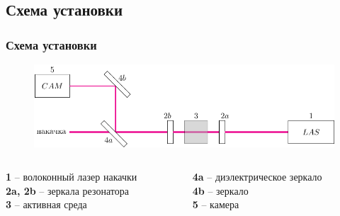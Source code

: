 \documentclass[10pt,pdf,hyperref={unicode}, dvipsnames]{beamer}
\newcommand\frametitless[1]{\subsection{#1}\frametitle{#1}}
\begin{document}
\begin{frame}
	\frametitless{Схема установки}
	\begin{figure}[tb]
		\centering
		\includegraphics[width=1\textwidth]{images/chem}
	\end{figure}
	\vspace{1cm}
	\begin{columns}
		\begin{column}{0.4\textwidth}
			\textbf{1} -- волоконный лазер накачки\\ 
			\textbf{2a, 2b} -- зеркала резонатора\\
			\textbf{3} -- активная среда
		\end{column}
		\begin{column}{0.4\textwidth}
			\textbf{4a} -- диэлектрическое зеркало\\
			\textbf{4b} -- зеркало\\
			\textbf{5} -- камера
		\end{column}
	\end{columns}
\end{frame}
\end{document}
